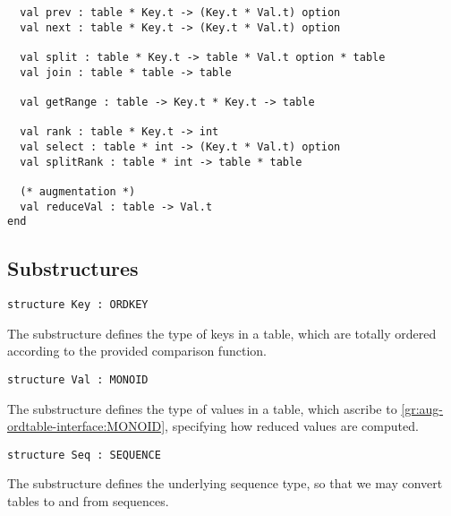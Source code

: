 \begin{cluster}
\begin{gram}
\begin{verbatim}
  val prev : table * Key.t -> (Key.t * Val.t) option
  val next : table * Key.t -> (Key.t * Val.t) option

  val split : table * Key.t -> table * Val.t option * table
  val join : table * table -> table

  val getRange : table -> Key.t * Key.t -> table

  val rank : table * Key.t -> int
  val select : table * int -> (Key.t * Val.t) option
  val splitRank : table * int -> table * table

  (* augmentation *)
  val reduceVal : table -> Val.t
end
\end{verbatim}

\end{gram}
\end{cluster}


\subsection{Substructures}
\label{sec:aug-ordtable-interface::substructures}

\begin{cluster}
\label{grp:grm:aug-ordtable-interface::key}

\begin{gram}[Key]
\label{grm:aug-ordtable-interface::key}
\begin{verbatim}
structure Key : ORDKEY
\end{verbatim}
The  substructure defines the type of keys in a table, which are
totally ordered according to the provided comparison function.

\end{gram}
\end{cluster}

\begin{cluster}
\label{grp:gr:aug-ordtable-interface:Val}

\begin{gram}[Val]
\label{gr:aug-ordtable-interface:Val}
\begin{verbatim}
structure Val : MONOID
\end{verbatim}
The  substructure defines the type of values in a table, which
ascribe to \ref{gr:aug-ordtable-interface:MONOID}, specifying how reduced
values are computed.

\end{gram}
\end{cluster}

\begin{cluster}
\label{grp:grm:aug-ordtable-interface::seq}

\begin{gram}[Seq]
\label{grm:aug-ordtable-interface::seq}
\begin{verbatim}
structure Seq : SEQUENCE
\end{verbatim}
The  substructure defines the underlying sequence type, so that we
may convert tables to and from sequences.

\end{gram}
\end{cluster}

